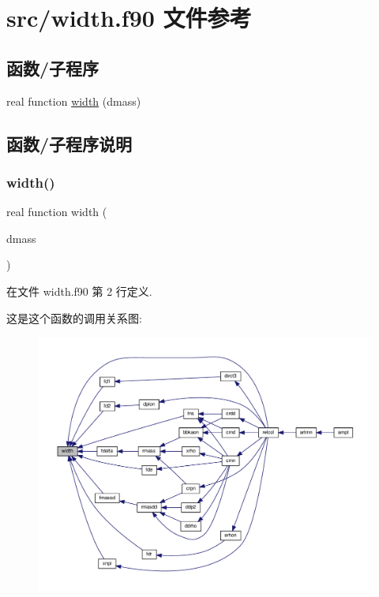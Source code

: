 \hypertarget{width_8f90}{}\section{src/width.f90 文件参考}
\label{width_8f90}
\subsection*{函数/子程序}
\begin{DoxyCompactItemize}
\item 
real function \mbox{\hyperlink{width_8f90_ad87dba8131333d4eb15220ebfac774e8}{width}} (dmass)
\end{DoxyCompactItemize}


\subsection{函数/子程序说明}
\mbox{\label{width_8f90_ad87dba8131333d4eb15220ebfac774e8}} 
\subsubsection{\texorpdfstring{width()}{width()}}
{\footnotesize\ttfamily real function width (\begin{DoxyParamCaption}\item[{}]{dmass }\end{DoxyParamCaption})}



在文件 width.\+f90 第 2 行定义.

这是这个函数的调用关系图\+:
\nopagebreak
\begin{figure}[H]
\begin{center}
\leavevmode
\includegraphics[width=350pt]{width_8f90_ad87dba8131333d4eb15220ebfac774e8_icgraph}
\end{center}
\end{figure}
